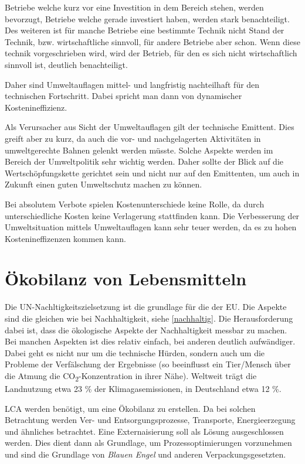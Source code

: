 \documentclass[11pt]{scrbook}
\begin{document}
Betriebe welche kurz vor eine Investition in dem Bereich stehen, werden bevorzugt, Betriebe welche gerade investiert haben, werden stark benachteiligt.
Des weiteren ist für manche Betriebe eine bestimmte Technik nicht Stand der Technik, bzw. wirtschaftliche sinnvoll, für andere Betriebe aber schon.
Wenn diese technik vorgeschrieben wird, wird der Betrieb, für den es sich nicht wirtschaftlich sinnvoll ist, deutlich benachteiligt.

Daher sind Umweltauflagen mittel- und langfristig nachteilhaft für den technischen Fortschritt.
Dabei spricht man dann von dynamischer Kostenineffizienz.

Als Verursacher aus Sicht der Umweltauflagen gilt der technische Emittent.
Dies greift aber zu kurz, da auch die vor- und nachgelagerten Aktivitäten in umweltgerechte Bahnen gelenkt werden müsste.
Solche Aspekte werden im Bereich der Umweltpolitik sehr wichtig werden.
Daher sollte der Blick auf die Wertschöpfungskette gerichtet sein und nicht nur auf den Emittenten, um auch in Zukunft einen guten Umweltschutz machen zu können.

Bei absolutem Verbote spielen Kostenunterschiede keine Rolle, da durch unterschiedliche Kosten keine Verlagerung stattfinden kann.
Die Verbesserung der Umweltsituation mittels Umweltauflagen kann sehr teuer werden, da es zu hohen Kostenineffizenzen kommen kann.

\section{Ökobilanz von Lebensmitteln}

Die \ac{UN}-Nachltigkeitszielsetzung ist die grundlage für die der \ac{EU}.
Die Aspekte sind die gleichen wie bei Nachhaltigkeit, siehe \cref{nachhaltig}.
Die Herausforderung dabei ist, dass die ökologische Aspekte der Nachhaltigkeit messbar zu machen.
Bei manchen Aspekten ist dies relativ einfach, bei anderen deutlich aufwändiger.
Dabei geht es nicht nur um die technische Hürden, sondern auch um die Probleme der Verfälschung der Ergebnisse (so beeinflusst ein Tier/Mensch über die Atmung die CO\textsubscript{2}-Konzentration in ihrer Nähe).
Weltweit trägt die Landnutzung etwa 23 \% der Klimagasemissionen, in Deutschland etwa 12 \%.

\ac{LCA} werden benötigt, um eine Ökobilanz zu erstellen.
Da bei solchen Betrachtung werden Ver- und Entsorgungsprozesse, Transporte, Energieerzegung und ähnliches betrachtet.
Eine Externaisierung soll als Lösung ausgeschlossen werden.
Dies dient dann als Grundlage, um Prozessoptimierungen vorzunehmen und sind die Grundlage von \textit{Blauen Engel} und anderen Verpackungsgesetzten.
\end{document}
